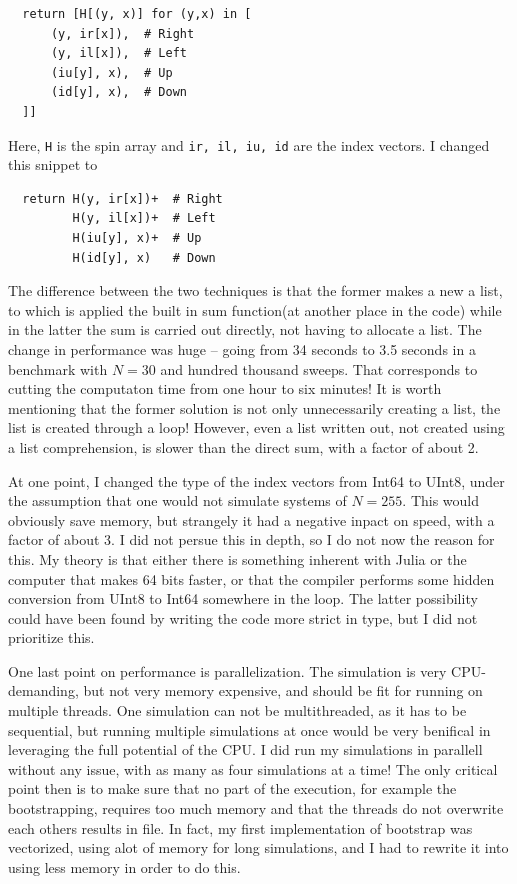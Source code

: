 \documentclass[12pt, a4paper]{article}
\begin{document}
\begin{lstlisting}
  return [H[(y, x)] for (y,x) in [
      (y, ir[x]),  # Right
      (y, il[x]),  # Left
      (iu[y], x),  # Up
      (id[y], x),  # Down
  ]]
\end{lstlisting}
Here, \verb|H| is the spin array and \verb|ir, il, iu, id| are the index vectors.
I changed this snippet to
\begin{lstlisting}
  return H(y, ir[x])+  # Right
         H(y, il[x])+  # Left
         H(iu[y], x)+  # Up
         H(id[y], x)   # Down
\end{lstlisting}
The difference between the two techniques is that the former makes a new a list, to which is applied the built in sum function(at another place in the code) while in the latter the sum is carried out directly, not having to allocate a list.
The change in performance was huge -- going from 34 seconds to 3.5 seconds in a benchmark with $N=30$ and hundred thousand sweeps.
That corresponds to cutting the computaton time from one hour to six minutes!
It is worth mentioning that the former solution is not only unnecessarily creating a list, the list is created through a loop!
However, even a list written out, not created using a list comprehension, is slower than the direct sum, with a factor of about 2.

At one point, I changed the type of the index vectors from Int64 to UInt8, under the assumption that one would not simulate systems of $N=255$.
This would obviously save memory, but strangely it had a negative inpact on speed, with a factor of about 3.
I did not persue this in depth, so I do not now the reason for this.
My theory is that either there is something inherent with Julia or the computer that makes 64 bits faster, or that the compiler performs some hidden conversion from UInt8 to Int64 somewhere in the loop.
The latter possibility could have been found by writing the code more strict in type, but I did not prioritize this.


One last point on performance is parallelization.
The simulation is very CPU-demanding, but not very memory expensive, and should be fit for running on multiple threads.
One simulation can not be multithreaded, as it has to be sequential, but running multiple simulations at once would be very benifical in leveraging the full potential of the CPU.
I did run my simulations in parallell without any issue, with as many as four simulations at a time!
The only critical point then is to make sure that no part of the execution, for example the bootstrapping, requires too much memory and that the threads do not overwrite each others results in file.
In fact, my first implementation of bootstrap was vectorized, using alot of memory for long simulations, and I had to rewrite it into using less memory in order to do this.
\end{document}
